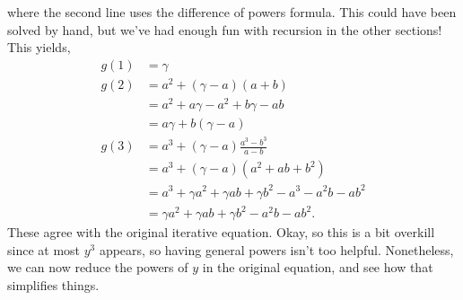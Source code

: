 \documentclass[../../main.tex]{subfiles}
\begin{document}
				where the second line uses the difference of powers formula. This could have been solved by hand, but we've had enough fun with recursion in the other sections! This yields,
				\begin{align}
					g(1) &= \gamma\\
					g(2) &= a^2 + (\gamma - a)(a + b) \\
						&= a^2 + a\gamma - a^2  + b\gamma - ab \\
						&= a\gamma + b(\gamma - a) \\
					g(3) &= a^3 + (\gamma - a)\frac{a^3 - b^3}{a - b} \\
						&= a^3 + (\gamma - a)(a^2 + ab + b^2) \\
						&= a^3 + \gamma a^2 + \gamma ab + \gamma b^2 - a^3 - a^2b - ab^2 \\
						&= \gamma a^2 + \gamma ab + \gamma b^2 - a^2b - ab^2.
				\end{align}
				These agree with the original iterative equation. Okay, so this is a bit overkill since at most $y^3$ appears, so having general powers isn't too helpful. Nonetheless, we can now reduce the powers of $y$ in the original equation, and see how that simplifies things.
\end{document}
